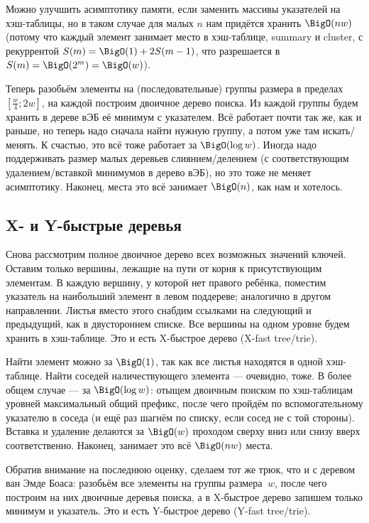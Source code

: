 Можно улучшить асимптотику памяти, если заменить массивы указателей на хэш-таблицы, но в таком случае для малых $n$ нам придётся хранить $\BigO(nw)$ (потому что каждый элемент занимает место в хэш-таблице, summary и cluster, с рекуррентой $S(m) = \BigO(1) + 2S(m-1)$, что разрешается в $S(m) = \BigO(2^m) = \BigO(w)$).

Теперь разобьём элементы на (последовательные) группы размера в пределах $[\frac{w}{4}; 2w]$, на каждой построим двоичное дерево поиска. Из каждой группы будем хранить в дереве вЭБ её минимум с указателем. Всё работает почти так же, как и раньше, но теперь надо сначала найти нужную группу, а потом уже там искать/менять. К счастью, это всё тоже работает за $\BigO(\log w)$. Иногда надо поддерживать размер малых деревьев слиянием/делением (с соответствующим удалением/вставкой минимумов в дерево вЭБ), но это тоже не меняет асимптотику. Наконец, места это всё занимает $\BigO(n)$, как нам и хотелось.

\subsection{X- и Y-быстрые деревья}

Снова рассмотрим полное двоичное дерево всех возможных значений ключей. Оставим только вершины, лежащие на пути от корня к присутствующим элементам. В каждую вершину, у которой нет правого ребёнка, поместим указатель на наибольший элемент в левом поддереве; аналогично в другом направлении. Листья вместо этого снабдим ссылками на следующий и предыдущий, как в двустороннем списке. Все вершины на одном уровне будем хранить в хэш-таблице. Это и есть X-быстрое дерево (X-fast tree/trie).

Найти элемент можно за $\BigO(1)$, так как все листья находятся в одной хэш-таблице. Найти соседей наличествующего элемента --- очевидно, тоже. В более общем случае --- за $\BigO(\log w)$: отыщем двоичным поиском по хэш-таблицам уровней максимальный общий префикс, после чего пройдём по вспомогательному указателю в соседа (и ещё раз шагнём по списку, если сосед не с той стороны). Вставка и удаление делаются за $\BigO(w)$ проходом сверху вниз или снизу вверх соответственно. Наконец, занимает это всё $\BigO(nw)$ места.

Обратив внимание на последнюю оценку, сделаем тот же трюк, что и с деревом ван Эмде Боаса: разобьём все элементы на группы размера $~w$, после чего построим на них двоичные деревья поиска, а в X-быстрое дерево запишем только минимум и указатель. Это и есть Y-быстрое дерево (Y-fast tree/trie).

